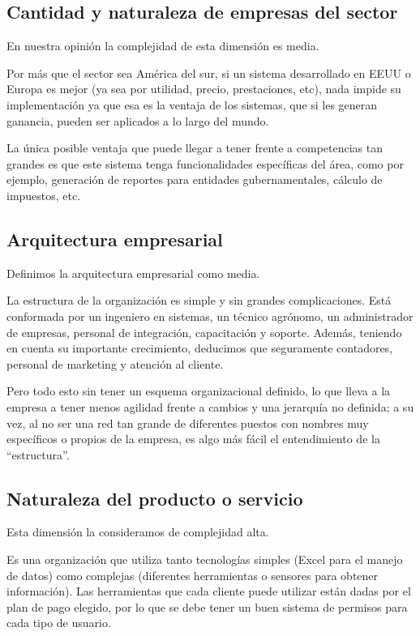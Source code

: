 \documentclass[man,12pt]{apa7}
\begin{document}
\subsection{Cantidad y naturaleza de empresas del sector}

En nuestra opinión la complejidad de esta dimensión es media.

Por más que el sector sea América del sur, si un sistema desarrollado en EEUU o Europa es mejor (ya sea por utilidad, precio, prestaciones, etc), nada impide su implementación ya que esa es la ventaja de los sistemas, que si les generan ganancia, pueden ser aplicados a lo largo del mundo.

La única posible ventaja que puede llegar a tener frente a competencias tan grandes es que este sistema tenga funcionalidades específicas del área, como por ejemplo, generación de reportes para entidades gubernamentales, cálculo de impuestos, etc.

\subsection{Arquitectura empresarial}

Definimos la arquitectura empresarial como media.

La estructura de la organización es simple y sin grandes complicaciones. Está conformada por un ingeniero en sistemas, un técnico agrónomo, un administrador de empresas, personal de integración, capacitación y soporte. Además, teniendo en cuenta su importante crecimiento, deducimos que seguramente contadores, personal de marketing y atención al cliente.

Pero todo esto sin tener un esquema organizacional definido, lo que lleva a la empresa a tener menos agilidad frente a cambios y una jerarquía no definida; a su vez, al no ser una red tan grande de diferentes puestos con nombres muy específicos o propios de la empresa, es algo más fácil el entendimiento de la “estructura”.

\subsection{Naturaleza del producto o servicio}

Esta dimensión la consideramos de complejidad alta.

Es una organización que utiliza tanto tecnologías simples (Excel para el manejo de datos) como complejas (diferentes herramientas o sensores para obtener información). Las herramientas que cada cliente puede utilizar están dadas por el plan de pago elegido, por lo que se debe tener un buen sistema de permisos para cada tipo de usuario.
\end{document}
